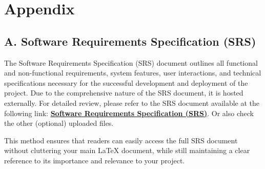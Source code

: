 \documentclass[12pt,a4paper]{article}
\begin{document}
\newpage
\appendix
\section*{Appendix}
\subsection*{A. Software Requirements Specification (SRS)}
The Software Requirements Specification (SRS) document outlines all functional and non-functional requirements, system features, user interactions, and technical specifications necessary for the successful development and deployment of the project. Due to the comprehensive nature of the SRS document, it is hosted externally. For detailed review, please refer to the SRS document available at the following link: \href{https://github.com/Warglaive/ProjectPlanFontys/blob/main/SRS.pdf}{\textbf{Software Requirements Specification (SRS)}}. Or also check the other (optional) uploaded files.

This method ensures that readers can easily access the full SRS document without cluttering your main LaTeX document, while still maintaining a clear reference to its importance and relevance to your project.
\newpage
\end{document}
